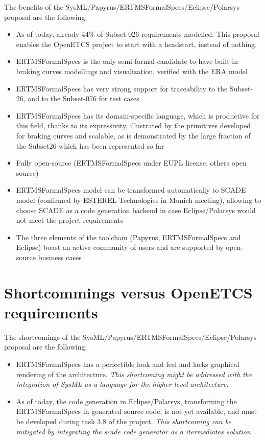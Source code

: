 The benefits of the SysML/Papyrus/ERTMSFormalSpecs/Eclipse/Polarsys proposal are the following:

\begin{itemize}
	\item As of today, already 44\% of Subset-026 requirements modelled. This proposal enables the OpenETCS project to start with a headstart, instead of nothing.
	\item ERTMSFormalSpecs is the only semi-formal candidate to have built-in braking curves modellings and visualization, verified with the ERA model
	\item ERTMSFormalSpecs has very strong support for traceability to the Subset-26, and to the Subset-076 for test cases
	\item ERTMSFormalSpecs has its domain-specific language, which is productive for this field, thanks to its expressivity, illustrated by the primitives
developed for braking curves and scalable, as is demonstrated by the large fraction of the Subset26 which has been represented so far
	\item Fully open-source (ERTMSFormalSpecs under EUPL license, others open source)
	\item ERTMSFormalSpecs model can be transformed automatically to SCADE model (confirmed by ESTEREL Technologies in Munich meeting), allowing to choose SCADE as a code generation backend in case Eclipse/Polarsys would not meet the project requirements
	\item The three elements of the toolchain (Papyrus, ERTMSFormalSpecs and Eclipse) boast an active community of users and are supported by open-source business cases
\end{itemize}

\section{Shortcommings versus OpenETCS requirements}

The shortcomings of the SysML/Papyrus/ERTMSFormalSpecs/Eclipse/Polarsys proposal are the following:

\begin{itemize}
	\item ERTMSFormalSpecs has a perfectible look and feel and lacks graphical rendering of the architecture. \emph{This shortcoming might be addressed with the integration of SysML as a language for the higher level architecture.}
	\item As of today, the code generation in Eclipse/Polarsys, transforming the ERTMSFormalSpecs in generated source code, is not yet available, and must be developed during task 3.8 of the project. \emph{This shortcoming can be mitigated by integrating the scade code generator as a itermediates solution.}
\end{itemize}

